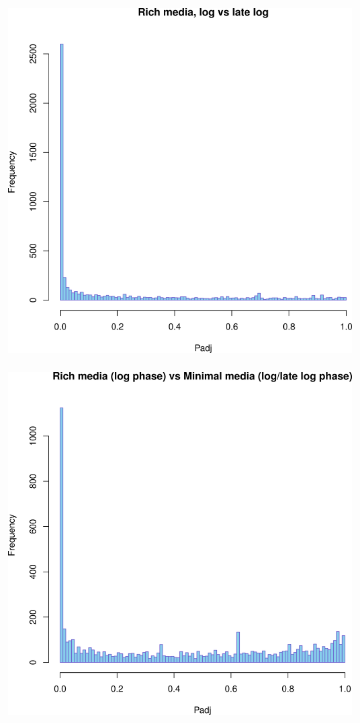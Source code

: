 \begin{figure}[H]
\begin{subfigure}{0.49\textwidth}
\includegraphics[width=0.9\linewidth]{psa/hist_richlog_richloglate.png} 
\end{subfigure}
\begin{subfigure}{0.49\textwidth}
\includegraphics[width=0.9\linewidth]{psa/hist_richlog_minimal.png}

\end{subfigure}
\end{figure}
